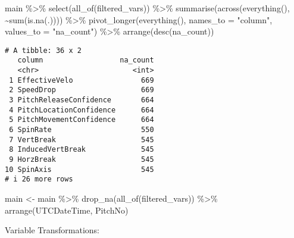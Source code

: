 \documentclass[
  letterpaper,
  DIV=11,
  numbers=noendperiod]{scrartcl}
\newenvironment{Shaded}{\begin{snugshade}}{\end{snugshade}}
\newcommand{\AttributeTok}[1]{\textcolor[rgb]{0.40,0.45,0.13}{#1}}
\newcommand{\FunctionTok}[1]{\textcolor[rgb]{0.28,0.35,0.67}{#1}}
\newcommand{\NormalTok}[1]{\textcolor[rgb]{0.00,0.23,0.31}{#1}}
\newcommand{\OtherTok}[1]{\textcolor[rgb]{0.00,0.23,0.31}{#1}}
\newcommand{\SpecialCharTok}[1]{\textcolor[rgb]{0.37,0.37,0.37}{#1}}
\newcommand{\StringTok}[1]{\textcolor[rgb]{0.13,0.47,0.30}{#1}}
\begin{document}
\begin{Shaded}
\begin{Highlighting}[]
\NormalTok{main }\SpecialCharTok{\%\textgreater{}\%}
  \FunctionTok{select}\NormalTok{(}\FunctionTok{all\_of}\NormalTok{(filtered\_vars)) }\SpecialCharTok{\%\textgreater{}\%}
  \FunctionTok{summarise}\NormalTok{(}\FunctionTok{across}\NormalTok{(}\FunctionTok{everything}\NormalTok{(), }\SpecialCharTok{\textasciitilde{}}\FunctionTok{sum}\NormalTok{(}\FunctionTok{is.na}\NormalTok{(.)))) }\SpecialCharTok{\%\textgreater{}\%}
  \FunctionTok{pivot\_longer}\NormalTok{(}\FunctionTok{everything}\NormalTok{(), }\AttributeTok{names\_to =} \StringTok{"column"}\NormalTok{, }\AttributeTok{values\_to =} \StringTok{"na\_count"}\NormalTok{) }\SpecialCharTok{\%\textgreater{}\%}
  \FunctionTok{arrange}\NormalTok{(}\FunctionTok{desc}\NormalTok{(na\_count))}
\end{Highlighting}
\end{Shaded}

\begin{verbatim}
# A tibble: 36 x 2
   column                  na_count
   <chr>                      <int>
 1 EffectiveVelo                669
 2 SpeedDrop                    669
 3 PitchReleaseConfidence       664
 4 PitchLocationConfidence      664
 5 PitchMovementConfidence      664
 6 SpinRate                     550
 7 VertBreak                    545
 8 InducedVertBreak             545
 9 HorzBreak                    545
10 SpinAxis                     545
# i 26 more rows
\end{verbatim}

\begin{Shaded}
\begin{Highlighting}[]
\NormalTok{main }\OtherTok{\textless{}{-}}\NormalTok{ main }\SpecialCharTok{\%\textgreater{}\%}
  \FunctionTok{drop\_na}\NormalTok{(}\FunctionTok{all\_of}\NormalTok{(filtered\_vars)) }\SpecialCharTok{\%\textgreater{}\%}
  \FunctionTok{arrange}\NormalTok{(UTCDateTime, PitchNo)}
\end{Highlighting}
\end{Shaded}

Variable Transformations:
\end{document}
